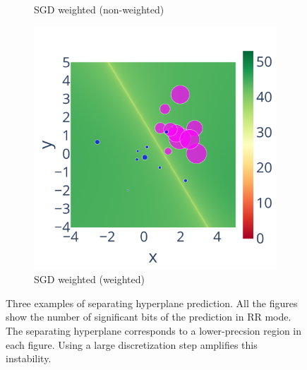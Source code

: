 \documentclass[10pt,journal,compsoc]{IEEEtran}
\begin{document}
\begin{figure}
\begin{subfigure}{.45\linewidth}
        \caption{SGD weighted (non-weighted)}
        \label{fig:weighted_nw_sig}
    \end{subfigure}
    \begin{subfigure}{.45\linewidth}
        \includegraphics[width=\linewidth]{figure/Weighted/weighted.pdf}
        \caption{SGD weighted (weighted)}
        \label{fig:weighted_w_sig}
    \end{subfigure}
    \caption{
        Three examples of separating hyperplane prediction. All the figures show the number of significant bits of the prediction in RR mode. The separating hyperplane corresponds to a lower-precsion region in each figure. Using a large discretization step amplifies
        this instability.
    }
    \label{fig:separating_hyperplan}
\end{figure}
\end{document}
